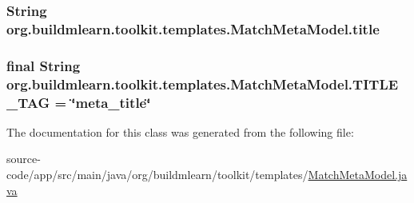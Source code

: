 \subsubsection[{\texorpdfstring{title}{title}}]{\setlength{\rightskip}{0pt plus 5cm}String org.\+buildmlearn.\+toolkit.\+templates.\+Match\+Meta\+Model.\+title\hspace{0.3cm}{\ttfamily [private]}}\hypertarget{classorg_1_1buildmlearn_1_1toolkit_1_1templates_1_1MatchMetaModel_af8bb459139f9fc8fe759c8c3e3060c51}{}\label{classorg_1_1buildmlearn_1_1toolkit_1_1templates_1_1MatchMetaModel_af8bb459139f9fc8fe759c8c3e3060c51}
\subsubsection[{\texorpdfstring{T\+I\+T\+L\+E\+\_\+\+T\+AG}{TITLE_TAG}}]{\setlength{\rightskip}{0pt plus 5cm}final String org.\+buildmlearn.\+toolkit.\+templates.\+Match\+Meta\+Model.\+T\+I\+T\+L\+E\+\_\+\+T\+AG = \char`\"{}meta\+\_\+title\char`\"{}\hspace{0.3cm}{\ttfamily [static]}}\hypertarget{classorg_1_1buildmlearn_1_1toolkit_1_1templates_1_1MatchMetaModel_a565a17bc9d90fd6ce54d18a58d026a7d}{}\label{classorg_1_1buildmlearn_1_1toolkit_1_1templates_1_1MatchMetaModel_a565a17bc9d90fd6ce54d18a58d026a7d}


The documentation for this class was generated from the following file\+:\begin{DoxyCompactItemize}
\item 
source-\/code/app/src/main/java/org/buildmlearn/toolkit/templates/\hyperlink{templates_2MatchMetaModel_8java}{Match\+Meta\+Model.\+java}\end{DoxyCompactItemize}
